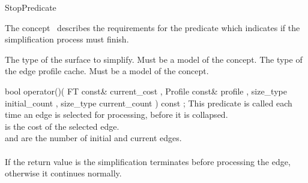 
\begin{ccRefFunctionObjectConcept}{StopPredicate}


\ccDefinition

The concept \ccRefName\ describes the requirements for the predicate which indicates if the simplification process must finish.

\ccTypes
  {The type of the surface to simplify. Must be a model of the  concept.}{}
\ccGlue    
\ccGlue    
\ccGlue    
  {The type of the edge profile cache. Must be a model of the  concept.}{}


\ccOperations
{}

  \ccTagFullDeclarations
  \ccMethod
    {bool operator()( FT const&       current_cost
                    , Profile  const& profile
                    , size_type       initial_count
                    , size_type       current_count
                    ) const ;
    }
    {
    This predicate is called each time an edge is selected for processing,
    before it is collapsed.\\
     is the cost of the selected edge.\\
     and  are the number of initial and current edges.\\
    \\
    If the return value is  the simplification terminates before processing the edge,
    otherwise it continues normally.
    }
  
\ccHasModels
{}\\

\end{ccRefFunctionObjectConcept}

